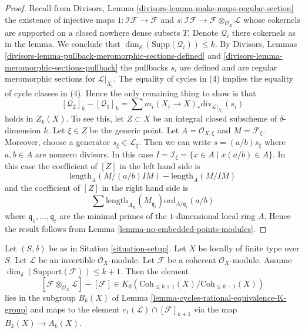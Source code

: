 \begin{proof}
Recall from Divisors, Lemma \ref{divisors-lemma-make-maps-regular-section}
the existence of injective maps
$1 : \mathcal{I}\mathcal{F} \to \mathcal{F}$ and
$s : \mathcal{I}\mathcal{F} \to \mathcal{F} \otimes_{\mathcal{O}_X}\mathcal{L}$
whose cokernels are supported on a closed nowhere dense subsets $T$.
Denote $\mathcal{Q}_i$ there cokernels as in the lemma.
We conclude that $\dim_\delta(\text{Supp}(\mathcal{Q}_i)) \leq k$.
By Divisors, Lemmas \ref{divisors-lemma-pullback-meromorphic-sections-defined}
and \ref{divisors-lemma-meromorphic-sections-pullback} the pullbacks $s_i$
are defined and are regular meromorphic sections for $\mathcal{L}|_{X_i}$.
The equality of cycles in (4) implies the equality of cycle classes
in (4). Hence the only remaining thing to show is that
$$
[\mathcal{Q}_2]_k - [\mathcal{Q}_1]_k
=
\sum m_i(X_i \to X)_*\text{div}_{\mathcal{L}|_{X_i}}(s_i)
$$
holds in $Z_k(X)$. To see this, let $Z \subset X$ be an integral closed
subscheme of $\delta$-dimension $k$. Let $\xi \in Z$ be the generic point.
Let $A = \mathcal{O}_{X, \xi}$ and $M = \mathcal{F}_\xi$.
Moreover, choose a generator $s_\xi \in \mathcal{L}_\xi$.
Then we can write $s = (a/b) s_\xi$ where $a, b \in A$ are
nonzero divisors. In this case
$I = \mathcal{I}_\xi = \{x \in A \mid x(a/b) \in A\}$.
In this case the coefficient of $[Z]$ in the left hand side is
$$
\text{length}_A(M/(a/b)IM) - \text{length}_A(M/IM)
$$
and the coefficient of $[Z]$ in the right hand side
is
$$
\sum
\text{length}_{A_{\mathfrak q_i}}(M_{\mathfrak q_i})
\text{ord}_{A/\mathfrak q_i}(a/b)
$$
where $\mathfrak q_1, \ldots, \mathfrak q_t$ are the minimal
primes of the $1$-dimensional local ring $A$. Hence the result
follows from Lemma \ref{lemma-no-embedded-points-modules}.
\end{proof}

\begin{lemma}
\label{lemma-coherent-sheaf-cap-c1}
Let $(S, \delta)$ be as in Sitation \ref{situation-setup}.
Let $X$ be locally of finite type over $S$.
Let $\mathcal{L}$ be an invertible $\mathcal{O}_X$-module.
Let $\mathcal{F}$ be a coherent $\mathcal{O}_X$-module.
Assume $\dim_\delta(\text{Support}(\mathcal{F})) \leq k + 1$.
Then the element
$$
[\mathcal{F} \otimes_{\mathcal{O}_X} \mathcal{L}]
-
[\mathcal{F}]
\in
K_0(\text{Coh}_{\leq k + 1}(X)/\text{Coh}_{\leq k - 1}(X))
$$
lies in the subgroup $B_k(X)$ of
Lemma \ref{lemma-cycles-rational-equivalence-K-group} and maps to
the element $c_1(\mathcal{L}) \cap [\mathcal{F}]_{k + 1}$ via
the map $B_k(X) \to A_k(X)$.
\end{lemma}

